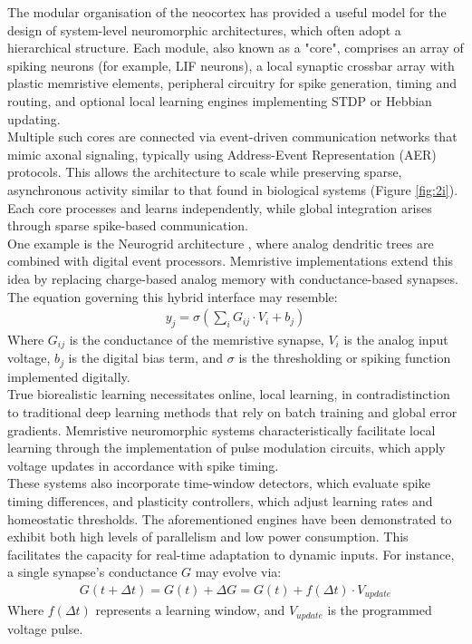 \noindent The modular organisation of the neocortex has provided a useful model for the design of system-level neuromorphic architectures, which often adopt a hierarchical structure. Each module, also known as a "core", comprises an array of spiking neurons (for example, LIF neurons), a local synaptic crossbar array with plastic memristive elements, peripheral circuitry for spike generation, timing and routing, and optional local learning engines implementing STDP or Hebbian updating.\\


\noindent Multiple such cores are connected via event-driven communication networks that mimic axonal signaling, typically using Address-Event Representation (AER) protocols. This allows the architecture to scale while preserving sparse, asynchronous activity similar to that found in biological systems (Figure \ref{fig:2i}). Each core processes and learns independently, while global integration arises through sparse spike-based communication.\\

\noindent One example is the Neurogrid architecture \cite{khodagholy2015neurogrid}, where analog dendritic trees are combined with digital event processors. Memristive implementations extend this idea by replacing charge-based analog memory with conductance-based synapses. The equation governing this hybrid interface may resemble:
\begin{align}
    y_j = \sigma \left( \sum_i G_{ij} \cdot V_i + b_j  \right) \label{eq:2.40}
\end{align}
\noindent Where $G_{ij}$ is the conductance of the memristive synapse, $V_i$ is the analog input voltage, $b_j$ is the digital bias term, and $\sigma$ is the thresholding or spiking function implemented digitally. \\

\noindent True biorealistic learning necessitates online, local learning, in contradistinction to traditional deep learning methods that rely on batch training and global error gradients. Memristive neuromorphic systems characteristically facilitate local learning through the implementation of pulse modulation circuits, which apply voltage updates in accordance with spike timing. \\

\noindent These systems also incorporate time-window detectors, which evaluate spike timing differences, and plasticity controllers, which adjust learning rates and homeostatic thresholds. The aforementioned engines have been demonstrated to exhibit both high levels of parallelism and low power consumption. This facilitates the capacity for real-time adaptation to dynamic inputs. For instance, a single synapse’s conductance $G$ may evolve via:
\begin{align}
    G(t + \Delta t) = G(t) + \Delta G = G(t) + f(\Delta t) \cdot V_{update} \label{eq:2.41}
\end{align}
\noindent Where $f(\Delta t)$ represents a learning window, and $V_{update}$ is the programmed voltage pulse.\\


